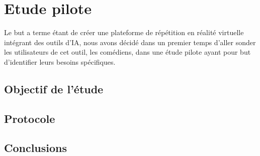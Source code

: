 \section{Etude pilote}

Le but a terme étant de créer une plateforme de répétition en réalité virtuelle intégrant des outils d'IA, nous avons décidé dans un premier temps d'aller sonder les utilisateurs de cet outil, les comédiens, dans une étude pilote ayant pour but d'identifier leurs besoins spécifiques. 

\subsection{Objectif de l'étude}

\subsection{Protocole}

\subsection{Conclusions}



